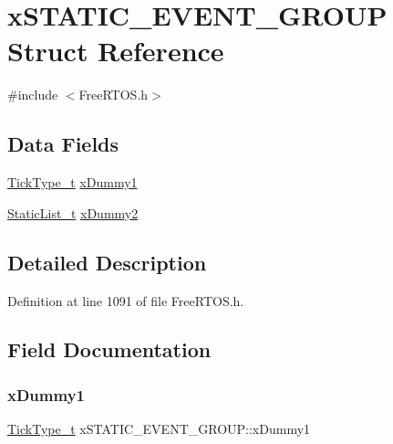 \hypertarget{structx_s_t_a_t_i_c___e_v_e_n_t___g_r_o_u_p}{}\section{x\+S\+T\+A\+T\+I\+C\+\_\+\+E\+V\+E\+N\+T\+\_\+\+G\+R\+O\+UP Struct Reference}
\label{structx_s_t_a_t_i_c___e_v_e_n_t___g_r_o_u_p}


{\ttfamily \#include $<$Free\+R\+T\+O\+S.\+h$>$}

\subsection*{Data Fields}
\begin{DoxyCompactItemize}
\item 
\hyperlink{portmacro_8h_aa69c48c6e902ce54f70886e6573c92a9}{Tick\+Type\+\_\+t} \hyperlink{structx_s_t_a_t_i_c___e_v_e_n_t___g_r_o_u_p_a4ed0094f715dd8f79a354f42fd973fc6}{x\+Dummy1}
\item 
\hyperlink{_free_r_t_o_s_8h_a9735ad9101a2bd25f83a62089a4acee6}{Static\+List\+\_\+t} \hyperlink{structx_s_t_a_t_i_c___e_v_e_n_t___g_r_o_u_p_a17d070c972ecd0151d7505a539653551}{x\+Dummy2}
\end{DoxyCompactItemize}


\subsection{Detailed Description}


Definition at line 1091 of file Free\+R\+T\+O\+S.\+h.



\subsection{Field Documentation}
\mbox{\label{structx_s_t_a_t_i_c___e_v_e_n_t___g_r_o_u_p_a4ed0094f715dd8f79a354f42fd973fc6}} 
\subsubsection{\texorpdfstring{x\+Dummy1}{xDummy1}}
{\footnotesize\ttfamily \hyperlink{portmacro_8h_aa69c48c6e902ce54f70886e6573c92a9}{Tick\+Type\+\_\+t} x\+S\+T\+A\+T\+I\+C\+\_\+\+E\+V\+E\+N\+T\+\_\+\+G\+R\+O\+U\+P\+::x\+Dummy1}



